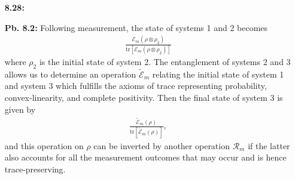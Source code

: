 \documentclass[a4paper,12pt]{article}
\begin{document}
\begin{enumerate}
    \item[\textbf{8.28:}]

    \item[\textbf{Pb. 8.2:}]
        Following measurement, the state of systems 1 and 2 becomes
        \begin{align*}
            \frac{\mathcal{E}_m(\rho \otimes \rho_2)}{\text{tr}[\mathcal{E}_m(\rho \otimes \rho_2)]}
        \end{align*}
        where $\rho_2$ is the initial state of system 2. The entanglement of systems 2 and 3 allows us to determine an operation $\widetilde{\mathcal{E}}_m$ relating the initial state of system 1 and system 3 which fulfills the axioms of trace representing probability, convex-linearity, and complete positivity. Then the final state of system 3 is given by
        \begin{align*}
            \frac{\widetilde{\mathcal{E}}_m(\rho)}{\text{tr}[\widetilde{\mathcal{E}}_m(\rho)]},
        \end{align*}
        and this operation on $\rho$ can be inverted by another operation $\mathcal{R}_m$ if the latter also accounts for all the measurement outcomes that may occur and is hence trace-preserving.

\end{enumerate}
\end{document}
